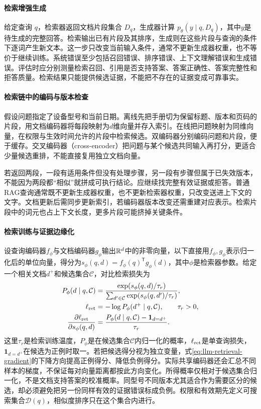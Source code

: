\paragraph{检索增强生成}
给定查询 $q$，检索器返回文档片段集合 $D_q$，生成器计算 $p_\theta(y\mid q,D_q)$，其中$y$是待生成的完整回答。检索输出已有片段及其排序，生成则在这些片段与查询的条件下逐词产生新文本。这一步只改变当前输入条件，通常不更新生成器权重，也不等价于继续训练。系统错误至少包括召回错误、排序错误、上下文理解错误和生成错误。评估时应分别测量检索召回、引用是否支持答案、答案正确性、答案完整性和拒答质量。检索结果只能提供候选证据，不能把不存在的证据变成可靠事实。

\paragraph{检索链中的编码与版本检查}
假设问题指定了设备型号和当前日期。离线先把手册切为保留标题、版本和页码的片段，用文档编码器将每段映射为$d$维向量并存入索引。在线把问题映射为同维向量，在权限与生效时间允许的片段中检索候选。双编码器分别编码问题和片段，便于缓存。交叉编码器（cross-encoder）把问题与某个候选共同输入再打分，更适合少量候选重排，不能直接复用独立文档向量。

若返回两段，一段有适用条件但没有处理步骤，另一段有步骤但属于已失效版本，不能因为两段都“相似”就拼成可执行结论。应继续找完整有效证据或拒答。普通RAG查询通常既不更新生成器权重，也不更新检索器权重，只改变送进上下文的文字。文档更新后需同步更新索引，若编码器版本改变还需重建对应表示。检索片段中的词元也占上下文长度，更多片段可能挤掉关键条件。

\paragraph{检索训练与证据边缘化}
设查询编码器$f_\phi$与文档编码器$g_\phi$输出$\mathbb{R}^d$中的非零向量，以下直接用$f_\phi,g_\phi$表示归一化后的单位向量，得分为$s_\phi(q,d)=f_\phi(q)^{\mathsf T}g_\phi(d)$，其中$\phi$是检索器参数。给定一个相关文档$d^+$和候选集合$\mathcal C$，对比检索损失为
\begin{align}
 P_\phi(d\mid q,\mathcal C)&=\frac{\exp(s_\phi(q,d)/\tau_r)}{\sum_{d'\in\mathcal C}\exp(s_\phi(q,d')/\tau_r)},\\
 \ell_{\rm ret}&=-\log P_\phi(d^+\mid q,\mathcal C),\qquad \tau_r>0,\\
 \frac{\partial\ell_{\rm ret}}{\partial s_\phi(q,d)}&=\frac{P_\phi(d\mid q,\mathcal C)-\mathbf1_{d=d^+}}{\tau_r}.\label{eq:llm-retrieval-gradient}
\end{align}
这里$\tau_r$是检索训练温度，$P_\phi$是在候选集合$\mathcal C$内归一化的概率，$\ell_{\rm ret}$是单查询损失，$\mathbf1_{d=d^+}$在候选为正例时取一。若把候选得分视为独立变量，式\eqref{eq:llm-retrieval-gradient}的下降方向提高正例得分、降低负例得分。实际共享编码器还会汇总不同样本的梯度，不保证每对向量距离都按此方向变化。所得概率仅相对于候选集合归一化，不是文档支持答案的校准概率。同型号不同版本尤其适合作为需要区分的候选，却必须避免把另一份同样有效的证据错误标成负例。权限和有效期先定义可搜索集合$\mathcal D(q)$，相似度排序只在这个集合内进行。


